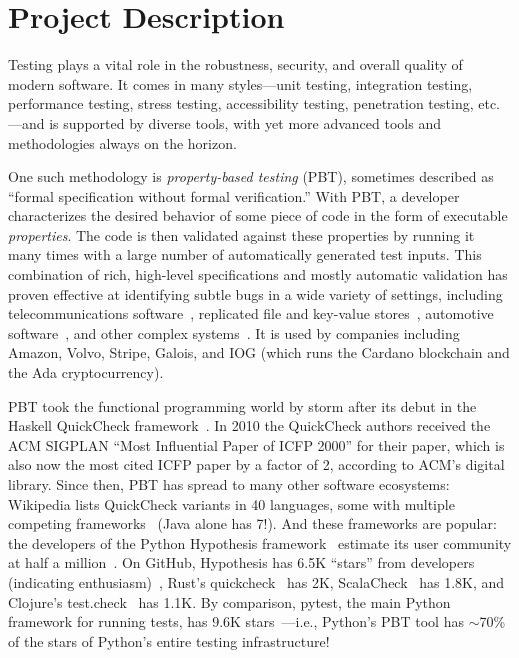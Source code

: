\section*{Project Description}

Testing plays a vital role in the robustness, security, and overall
quality of modern software. It comes in many styles---unit testing,
integration testing, performance testing, stress testing,
accessibility testing, penetration testing, etc.---and is supported by
diverse tools, with yet more advanced tools and methodologies always on
the horizon.

One such methodology is {\em property-based testing} (PBT),
sometimes described as ``formal specification without formal
verification.''  With PBT, a developer characterizes the desired
behavior of
some piece of code in the form of executable {\em
  properties}. The code is
then validated against these properties by running it many times
with a large number of automatically generated test
inputs.
%
This combination of rich, high-level specifications and mostly
automatic validation has proven effective at identifying
subtle bugs in a wide variety of settings, including
telecommunications software~\cite{arts2006testing}, replicated
file and key-value
stores~\cite{MysteriesOfDropbox2016,Bornholt2021}, automotive
software~\cite{arts2015testing}, and other complex
systems~\cite{hughes_experiences_2016}.
It is used by companies including Amazon, Volvo, Stripe, Galois,
and IOG (which
runs the Cardano blockchain and the Ada cryptocurrency).

PBT took the functional programming world by storm after its
debut in the Haskell QuickCheck framework~\cite{ClaessenHughes00}.  In
2010 the
QuickCheck authors received the ACM SIGPLAN ``Most Influential Paper of ICFP
2000'' for their paper, which is also now the most cited
ICFP paper by
a factor of 2, according to ACM's digital library.  Since then,
PBT has spread to many other software ecosystems:
%
Wikipedia lists QuickCheck variants in 40 languages, some
with multiple competing frameworks~\cite{QuickCheckWikipedia} (Java alone has
7!).
%
And these frameworks are popular:
the developers of the Python Hypothesis framework~\cite{maciver2019hypothesis,HypothesisGithub} estimate its user community
at half a million~\cite{ZacPersonalCommunication,noauthor_python_nodate}.  On GitHub,
Hypothesis has 6.5K ``stars'' from developers (indicating enthusiasm)~\cite{borges_whats_2018}, Rust's
quickcheck~\cite{RustQuickcheckGithub} has 2K,
ScalaCheck~\cite{ScalaCheckGithub} has 1.8K, and Clojure's
test.check~\cite{ClojureTest.checkGithub} has 1.1K.
By comparison, pytest, the main Python framework for running
tests, has 9.6K stars~\cite{PytestGitHub}---i.e., Python's
PBT tool has $\sim$70\% of the stars of Python's entire testing
infrastructure!

